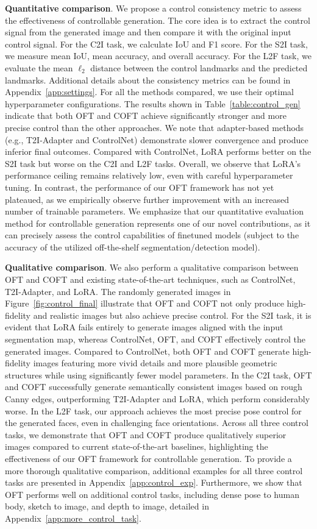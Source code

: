 \textbf{Quantitative comparison}. We propose a control consistency metric to assess the effectiveness of controllable generation. The core idea is to extract the control signal from the generated image and then compare it with the original input control signal. For the C2I task, we calculate IoU and F1 score. For the S2I task, we measure mean IoU, mean accuracy, and overall accuracy. For the L2F task, we evaluate the mean $\ell_2$ distance between the control landmarks and the predicted landmarks. Additional details about the consistency metrics can be found in Appendix~\ref{app:settings}. For all the methods compared, we use their optimal hyperparameter configurations. The results shown in Table~\ref{table:control_gen} indicate that both OFT and COFT achieve significantly stronger and more precise control than the other approaches. We note that adapter-based methods (e.g., T2I-Adapter and ControlNet) demonstrate slower convergence and produce inferior final outcomes. Compared with ControlNet, LoRA performs better on the S2I task but worse on the C2I and L2F tasks. Overall, we observe that LoRA’s performance ceiling remains relatively low, even with careful hyperparameter tuning. In contrast, the performance of our OFT framework has not yet plateaued, as we empirically observe further improvement with an increased number of trainable parameters. We emphasize that our quantitative evaluation method for controllable generation represents one of our novel contributions, as it can precisely assess the control capabilities of finetuned models (subject to the accuracy of the utilized off-the-shelf segmentation/detection model).

\textbf{Qualitative comparison}. We also perform a qualitative comparison between OFT and COFT and existing state-of-the-art techniques, such as ControlNet, T2I-Adapter, and LoRA. The randomly generated images in Figure~\ref{fig:control_final} illustrate that OFT and COFT not only produce high-fidelity and realistic images but also achieve precise control. For the S2I task, it is evident that LoRA fails entirely to generate images aligned with the input segmentation map, whereas ControlNet, OFT, and COFT effectively control the generated images. Compared to ControlNet, both OFT and COFT generate high-fidelity images featuring more vivid details and more plausible geometric structures while using significantly fewer model parameters. In the C2I task, OFT and COFT successfully generate semantically consistent images based on rough Canny edges, outperforming T2I-Adapter and LoRA, which perform considerably worse. In the L2F task, our approach achieves the most precise pose control for the generated faces, even in challenging face orientations. Across all three control tasks, we demonstrate that OFT and COFT produce qualitatively superior images compared to current state-of-the-art baselines, highlighting the effectiveness of our OFT framework for controllable generation. To provide a more thorough qualitative comparison, additional examples for all three control tasks are presented in Appendix~\ref{app:control_exp}. Furthermore, we show that OFT performs well on additional control tasks, including dense pose to human body, sketch to image, and depth to image, detailed in Appendix~\ref{app:more_control_task}.

